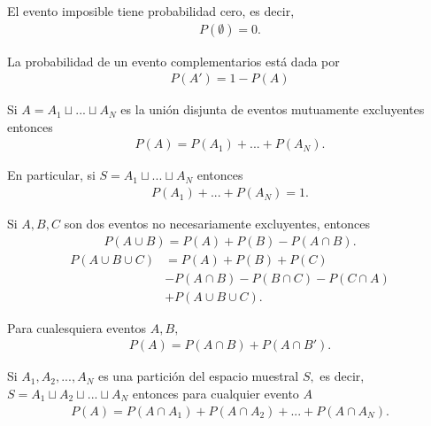 \begin{thm}
	\label{thm:1.3}
 El evento imposible tiene probabilidad cero, es decir,
 \begin{align}
  P(\emptyset)=0.
 \end{align}
\end{thm}


{}
\begin{thm}
 \label{thm:1.4} La probabilidad de un evento complementarios está dada por
 \begin{align}
 \label{1.7}
   P(A')=1-P(A)
  \end{align}
\end{thm}


{}
\begin{thm}
 \label{thm:1.5} Si $A=A_{1}\sqcup...\sqcup A_{N}$ es la unión disjunta de eventos mutuamente excluyentes entonces
 \begin{align}
 \label{1.8}
P(A)=P(A_{1})+...+P(A_{N}).
\end{align}


En particular, si $S=A_{1}\sqcup...\sqcup A_{N}$ entonces
 \begin{align}
 \label{1.9}
P(A_{1})+...+P(A_{N})=1.
\end{align}
\end{thm}


{}
\begin{thm}
 \label{thm:1.6}
  Si $A,B,C$ son dos eventos no necesariamente excluyentes, entonces
 \begin{align}
   \label{1.10}
   P(A\cup B)=P(A)+P(B)-P(A\cap B).
 \end{align}
 \begin{align}
 \label{1.11}
	P(A\cup B \cup C)&=P(A)+P(B)+P(C)\\
	&-P(A\cap B)-P(B\cap C)-P(C\cap A)\\
	&+P(A\cup B \cup C).
\end{align}
\end{thm}



{}
\begin{thm}
\label{thm:1.7}
 Para cualesquiera eventos $A,B,$
\begin{align}
 \label{1.12}
 P(A)=P(A\cap B)+P(A\cap B').
\end{align}
\end{thm}


{}
\begin{thm}
 \label{thm:1.8}
 Si $A_{1},A_{2},..., A_{N}$ es una partición del espacio muestral $S,$ es decir,
 $S=A_{1} \sqcup A_{2} \sqcup ... \sqcup A_{N}$ entonces para cualquier evento $A$
 \begin{align}
  \label{1.13}
  P(A)=P(A\cap A_{1})+ P(A\cap A_{2}) + ... +P(A\cap A_{N}).
 \end{align}
\end{thm}


